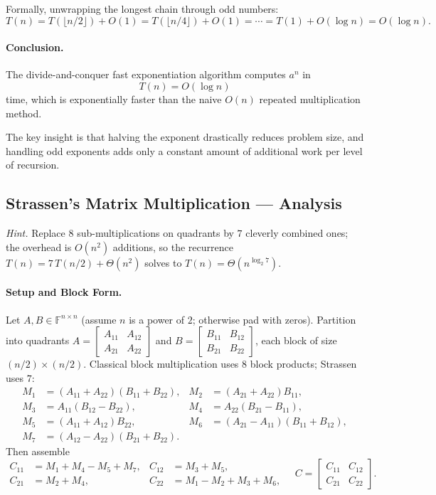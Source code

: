 \documentclass[9pt]{extarticle}
\begin{document}
Formally, unwrapping the longest chain through odd numbers:
\[
  T(n)
    = T(\lfloor n/2 \rfloor) + O(1)
    = T(\lfloor n/4 \rfloor) + O(1)
    = \cdots
    = T(1) + O(\log n)
    = O(\log n).
\]

\paragraph{Conclusion.}
The divide-and-conquer fast exponentiation algorithm computes $a^n$ in
\[
  T(n) = O(\log n)
\]
time, which is exponentially faster than the naive $O(n)$ repeated multiplication method.

The key insight is that halving the exponent drastically reduces problem size, and
handling odd exponents adds only a constant amount of additional work per level of recursion.

\subsection{Strassen’s Matrix Multiplication — Analysis}
\textit{Hint.} Replace $8$ sub-multiplications on quadrants by $7$ cleverly combined ones; the overhead is $O(n^2)$ additions, so the recurrence $T(n)=7\,T(n/2)+\Theta(n^2)$ solves to $T(n)=\Theta\!\left(n^{\log_2 7}\right)$.

\paragraph{Setup and Block Form.}
Let $A,B\in\mathbb{F}^{n\times n}$ (assume $n$ is a power of $2$; otherwise pad with zeros).
Partition into quadrants $A=\begin{bmatrix}A_{11}&A_{12}\\A_{21}&A_{22}\end{bmatrix}$ and $B=\begin{bmatrix}B_{11}&B_{12}\\B_{21}&B_{22}\end{bmatrix}$, each block of size $(n/2)\times(n/2)$.
Classical block multiplication uses $8$ block products; Strassen uses $7$:
\[
\begin{aligned}
M_1&=(A_{11}+A_{22})(B_{11}+B_{22}), &
M_2&=(A_{21}+A_{22})B_{11},\\
M_3&=A_{11}(B_{12}-B_{22}), &
M_4&=A_{22}(B_{21}-B_{11}),\\
M_5&=(A_{11}+A_{12})B_{22}, &
M_6&=(A_{21}-A_{11})(B_{11}+B_{12}),\\
M_7&=(A_{12}-A_{22})(B_{21}+B_{22}).
\end{aligned}
\]
Then assemble
\[
\begin{aligned}
C_{11}&=M_1+M_4-M_5+M_7, &
C_{12}&=M_3+M_5,\\
C_{21}&=M_2+M_4, &
C_{22}&=M_1-M_2+M_3+M_6,
\end{aligned}
\quad
C=\begin{bmatrix}C_{11}&C_{12}\\C_{21}&C_{22}\end{bmatrix}.
\]
\end{document}
